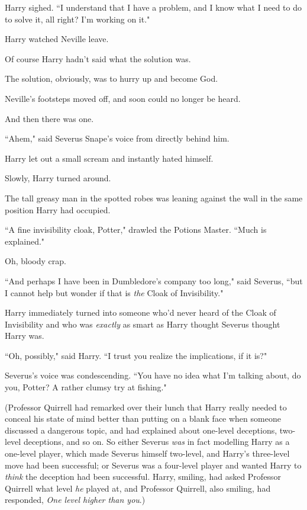 Harry sighed. ``I understand that I have a problem, and I know what I need to do to solve it, all right? I'm working on it."

\later

Harry watched Neville leave.

Of course Harry hadn't said what the solution was.

The solution, obviously, was to hurry up and become God.

Neville's footsteps moved off, and soon could no longer be heard.

And then there was one.

``Ahem," said Severus Snape's voice from directly behind him.

Harry let out a small scream and instantly hated himself.

Slowly, Harry turned around.

The tall greasy man in the spotted robes was leaning against the wall in the same position Harry had occupied.

``A fine invisibility cloak, Potter," drawled the Potions Master. ``Much is explained."

Oh, bloody crap.

``And perhaps I have been in Dumbledore's company too long," said Severus, ``but I cannot help but wonder if that is \emph{the} Cloak of Invisibility."

Harry immediately turned into someone who'd never heard of the Cloak of Invisibility and who was \emph{exactly} as smart as Harry thought Severus thought Harry was.

``Oh, possibly," said Harry. ``I trust you realize the implications, if it is?"

Severus's voice was condescending. ``You have no idea what I'm talking about, do you, Potter? A rather clumsy try at fishing."

(Professor Quirrell had remarked over their lunch that Harry really needed to conceal his state of mind better than putting on a blank face when someone discussed a dangerous topic, and had explained about one-level deceptions, two-level deceptions, and so on. So either Severus \emph{was} in fact modelling Harry as a one-level player, which made Severus himself two-level, and Harry's three-level move had been successful; or Severus was a four-level player and wanted Harry to \emph{think} the deception had been successful. Harry, smiling, had asked Professor Quirrell what level \emph{he} played at, and Professor Quirrell, also smiling, had responded, \emph{One level higher than you}.)

